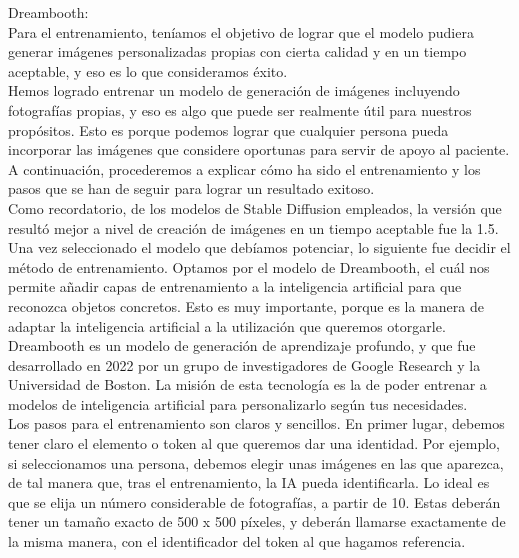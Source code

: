 Dreambooth:\\
Para el entrenamiento, teníamos el objetivo de lograr que el modelo pudiera generar imágenes personalizadas propias con cierta calidad y en un tiempo aceptable, y eso es lo que consideramos éxito.\\
Hemos logrado entrenar un modelo de generación de imágenes incluyendo fotografías propias, y eso es algo que puede ser realmente útil para nuestros propósitos. Esto es porque podemos lograr que cualquier persona pueda incorporar las imágenes que considere oportunas para servir de apoyo al paciente. A continuación, procederemos a explicar cómo ha sido el entrenamiento y los pasos que se han de seguir para lograr un resultado exitoso.\\

Como recordatorio, de los modelos de Stable Diffusion empleados, la versión que resultó mejor a nivel de creación de imágenes en un tiempo aceptable fue la 1.5. Una vez seleccionado el modelo que debíamos potenciar, lo siguiente fue decidir el método de entrenamiento. Optamos por el modelo de Dreambooth, el cuál nos permite añadir capas de entrenamiento a la inteligencia artificial para que reconozca objetos concretos. Esto es muy importante, porque es la manera de adaptar la inteligencia artificial a la utilización que queremos otorgarle.\\

Dreambooth es un modelo de generación de aprendizaje profundo, y que fue desarrollado en 2022 por un grupo de investigadores de Google Research y la Universidad de Boston. La misión de esta tecnología es la de poder entrenar a modelos de inteligencia artificial para personalizarlo según tus necesidades.\\


Los pasos para el entrenamiento son claros y sencillos. En primer lugar, debemos tener claro el elemento o token al que queremos dar una identidad. Por ejemplo, si seleccionamos una persona, debemos elegir unas imágenes en las que aparezca, de tal manera que, tras el entrenamiento, la IA pueda identificarla. Lo ideal es que se elija un número considerable de fotografías, a partir de 10. Estas deberán tener un tamaño exacto de 500 x 500 píxeles, y deberán llamarse exactamente de la misma manera, con el identificador del token al que hagamos referencia.\\

